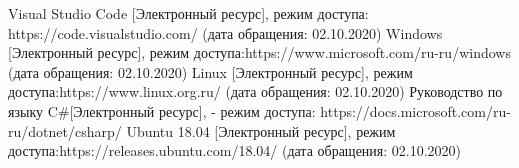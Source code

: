 \begin{thebibliography}{3}
	Visual Studio Code [Электронный ресурс], режим доступа: https://code.visualstudio.com/ (дата обращения: 02.10.2020)
	Windows [Электронный ресурс], режим доступа:https://www.microsoft.com/ru-ru/windows (дата обращения: 02.10.2020)
	Linux [Электронный ресурс], режим доступа:https://www.linux.org.ru/ (дата обращения: 02.10.2020)
	Руководство по языку C\#[Электронный ресурс], - режим доступа: https://docs.microsoft.com/ru-ru/dotnet/csharp/
	Ubuntu 18.04 [Электронный ресурс], режим доступа:https://releases.ubuntu.com/18.04/ (дата обращения: 02.10.2020)
\end{thebibliography}
